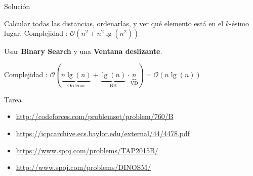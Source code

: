 \documentclass[compress]{beamer}
\begin{document}
\begin{frame}{Solución}
	\begin{enumerate}
		\item Calcular todas las distancias, ordenarlas, y ver qué elemento está en
    el $k$-ésimo lugar. Complejidad : $\mathcal{O}(n^2 + n^2 \lg(n^2))$
		\pause
     {
		\item Usar \textbf{Binary Search} y una \textbf{Ventana deslizante}.
    }
		\pause
		\pause
		\pause
     {
		  Complejidad :
        $\mathcal{O} (\underbrace{n \lg(n)}_{\text{Ordenar}} + \underbrace{\lg(n)}_{\text{BB}} \cdot \underbrace{n}_{\text{VD}}) = \mathcal{O} (n \lg(n))$
    }
	\end{enumerate}
\end{frame}
\begin{frame}{Tarea}
  \begin{itemize}
    \item \url{http://codeforces.com/problemset/problem/760/B}
    \item \url{https://icpcarchive.ecs.baylor.edu/external/44/4478.pdf}
    \item \url{https://www.spoj.com/problems/TAP2015B/}
    \item \url{http://www.spoj.com/problems/DINOSM/}
  \end{itemize}
\end{frame}
\end{document}
